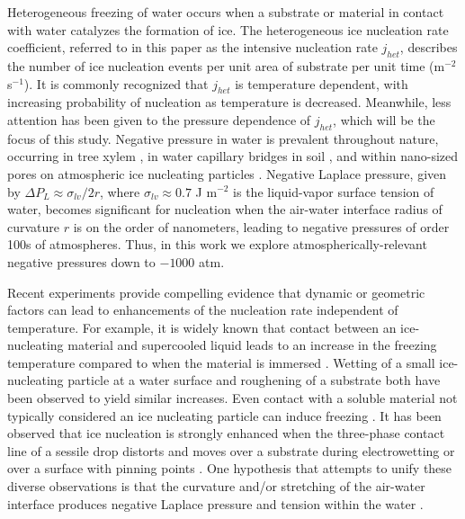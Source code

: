 \documentclass[journal abbreviation, manuscript]{copernicus}
\begin{document}
\introduction

Heterogeneous freezing of water occurs when a substrate or material in contact with water catalyzes the formation of ice. The heterogeneous ice nucleation rate coefficient, referred to in this paper as the intensive nucleation rate $j_{het}$, describes the number of ice nucleation events per unit area of substrate per unit time (m$^{-2}$ s$^{-1}$). It is commonly recognized that $j_{het}$ is temperature dependent, with increasing probability of nucleation as temperature is decreased. Meanwhile, less attention has been given to the pressure dependence of $j_{het}$, which will be the focus of this study. Negative pressure in water is prevalent throughout nature, occurring in tree xylem \citep{jacobsen2007xylem}, in water capillary bridges in soil \citep{seiphoori2020}, and within nano-sized pores on atmospheric ice nucleating particles \citep{david2020role,marcolli2020technical,klumpp2023comparing}. Negative Laplace pressure, given by $\Delta P_L \approx \sigma_{lv}/2r$, where $\sigma_{lv} \approx 0.7$ J m$^{-2}$ is the liquid-vapor surface tension of water, becomes significant for nucleation when the air-water interface radius of curvature $r$ is on the order of nanometers, leading to negative pressures of order 100s of atmospheres. Thus, in this work we explore atmospherically-relevant negative pressures down to $-1000$ atm. %

Recent experiments provide compelling evidence that dynamic or geometric factors can lead to enhancements of the nucleation rate independent of temperature. For example, it is widely known that contact between an ice-nucleating material and supercooled liquid leads to an increase in the freezing temperature compared to when the material is immersed \citep{pitter1973wind,levin1983contact,diehl2002ice}. Wetting of a small ice-nucleating particle at a water surface \citep{shaw2005} and roughening of a substrate \citep{gurganus2014nucleation} both have been observed to yield similar increases. Even contact with a soluble material not typically considered an ice nucleating particle can induce freezing \citep{niehaus2015}. It has been observed that ice nucleation is strongly enhanced when the three-phase contact line of a sessile drop distorts and moves over a substrate during electrowetting \citep{yang2015} or over a surface with pinning points \citep{yang2018}. One hypothesis that attempts to unify these diverse observations is that the curvature and/or stretching of the air-water interface produces negative Laplace pressure and tension within the water \citep{marcolli2017,yang2020}. 
\end{document}
